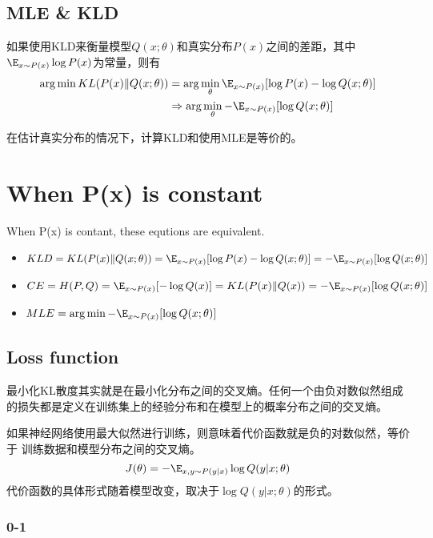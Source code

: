 \subsection{MLE \& KLD}
如果使用KLD来衡量模型$Q(x;\theta)$和真实分布$P(x)$之间的差距，其中$\E_{x \sim P(x)}\log P(x)$为常量，则有
\begin{equation}
    \begin{split}
    \arg \min KL(P(x)\|Q(x;\theta))
        &= \arg \min_{\theta} \E_{x \sim P(x)}[\log P(x) - \log Q(x;\theta)] \\
        &\Rightarrow \arg \min_{\theta} - \E_{x \sim P(x)}[\log Q(x;\theta)]
    \end{split}
\end{equation}

在估计真实分布的情况下，计算KLD和使用MLE是等价的。

\section{When P(x) is constant}
When P(x) is contant, these equtions are equivalent.
\begin{itemize}
    \item $ KLD = KL(P(x)\|Q(x;\theta)) = \E_{x \sim P(x)}[\log P(x) - \log Q(x; \theta)] = - \E_{x \sim P(x)}[\log Q(x;\theta)] $
    \item $ CE = H(P, Q) = \E_{x \sim P(x)}[- \log Q(x)] = KL(P(x)\|Q(x)) = - \E_{x \sim P(x)}[\log Q(x;\theta)] $
    \item $ MLE = \arg \min - \E _{x \sim P(x)}[\log Q(x; \theta)]$
\end{itemize}

\subsection{Loss function}

最小化KL散度其实就是在最小化分布之间的交叉熵。任何一个由负对数似然组成的损失都是定义在训练集上的经验分布和在模型上的概率分布之间的交叉熵。

如果神经网络使用最大似然进行训练，则意味着代价函数就是负的对数似然，等价于 训练数据和模型分布之间的交叉熵。
\[J(\theta) = - \E _{x,y \sim P(y|x)} \log Q(y|x; \theta)\]
代价函数的具体形式随着模型改变，取决于$\log Q(y|x; \theta)$的形式。

\subsubsection{0-1}

